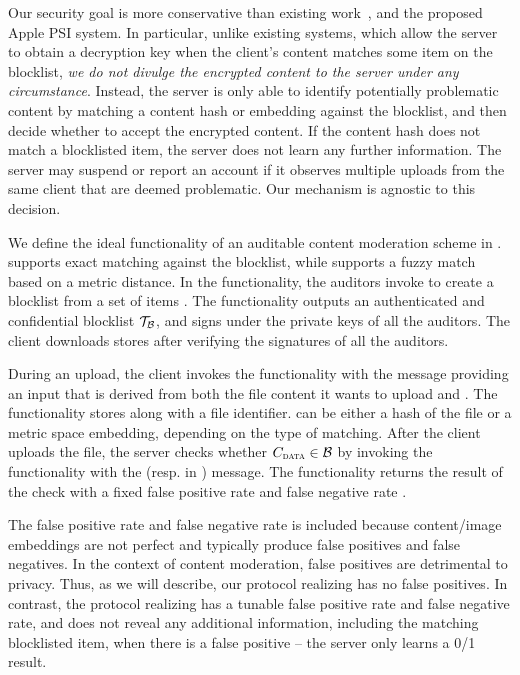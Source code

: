 Our security goal is more conservative than existing work~\cite{kulshrestha2021identifying,scheffler2023public}, and the proposed Apple PSI system. In particular, unlike existing systems, which allow the server to obtain a decryption key when the client's content matches some item on the blocklist, \emph{we do not divulge the encrypted content to the server under any circumstance}. Instead, the server is only able to identify potentially problematic content by matching a content hash or embedding against the blocklist, and then decide whether to accept the encrypted content. If the content hash does not match a blocklisted item, the server does not learn any further information. The server may suspend or report an account if it observes multiple uploads from the same client that are deemed problematic. Our mechanism is agnostic to this decision. 

%
We define the ideal functionality of an auditable content moderation scheme in . \contentModFuncExact supports exact matching against the blocklist, while \contentModFuncFuzzy supports a fuzzy match based on a metric distance. In the functionality, the auditors invoke \createBlocklist to create a blocklist from a set of items \blocklist. The functionality outputs an authenticated and confidential blocklist $\blklistToken$, and signs \blklistToken under the private keys of all the auditors. The client downloads stores \blklistToken after verifying the signatures of all the auditors. 

During an upload, the client invokes the functionality with the \uploadFile message providing an input \clientMeta that is derived from both the file content it wants to upload and \blklistToken. The functionality stores \clientMeta along with a file identifier. \clientMeta can be either a hash of the file or a metric space embedding, depending on the type of matching. After the client uploads the file, the server checks whether $\clientMeta \in \blocklist$ by invoking the functionality with the \checkContent (resp. \checkContentFuzzy in \contentModFuncFuzzy) message. The functionality returns the result of the check with a fixed false positive rate \fpr and false negative rate \fnr. 

The false positive rate and false negative rate is included because content/image embeddings are not perfect and typically produce false positives and false negatives. In the context of content moderation, false positives are detrimental to privacy. Thus, as we will describe, our protocol realizing \contentModFuncExact has no false positives. In contrast, the protocol realizing \contentModFuncFuzzy has a tunable false positive rate and false negative rate, and does not reveal any additional information, including the matching blocklisted item, when there is a false positive -- the server only learns a 0/1 result.  

